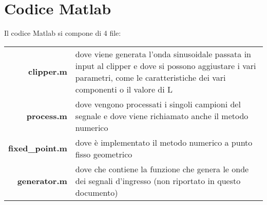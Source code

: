 \chapter{Codice Matlab}
	\label{code:matlab}
	Il codice Matlab si compone di 4 file:
	
	\noindent\hspace{5px}\begin{tabularx}{\textwidth}{r X}
		\textbf{clipper.m}			&dove viene generata l'onda sinusoidale passata in input al clipper e dove si possono aggiustare i vari parametri, come le caratteristiche dei vari componenti o il valore di L\\
		\textbf{process.m}			&dove vengono processati i singoli campioni del segnale e dove viene richiamato anche il metodo numerico\\
		\textbf{fixed\_point.m}		&dove è implementato il metodo numerico a punto fisso geometrico\\
		\textbf{generator.m}			&dove che contiene la funzione che genera le onde dei segnali d'ingresso (non riportato in questo documento)
	\end{tabularx}\\
	
